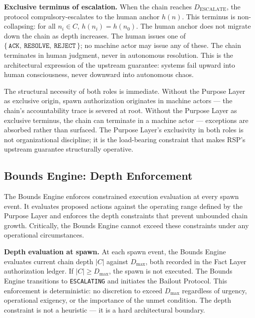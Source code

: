 \medskip
\noindent\textbf{Exclusive terminus of escalation.} When the chain reaches $D_{\mathrm{ESCALATE}}$, the protocol compulsory-escalates to the human anchor $h(n)$. This terminus is non-collapsing: for all $n_i \in C$, $h(n_i) = h(n_0)$. The human anchor does not migrate down the chain as depth increases. The human issues one of $\{\,\texttt{ACK},\ \texttt{RESOLVE},\ \texttt{REJECT}\,\}$; no machine actor may issue any of these. The chain terminates in human judgment, never in autonomous resolution. This is the architectural expression of the upstream \bxthree{} guarantee: \bxthree{} systems fail upward into human consciousness, never downward into autonomous chaos.

The structural necessity of both roles is immediate. Without the Purpose Layer as exclusive origin, spawn authorization originates in machine actors — the chain's accountability trace is severed at root. Without the Purpose Layer as exclusive terminus, the chain can terminate in a machine actor — exceptions are absorbed rather than surfaced. The Purpose Layer's exclusivity in both roles is not organizational discipline; it is the load-bearing constraint that makes RSP's upstream guarantee structurally operative.

\subsection{Bounds Engine: Depth Enforcement}
\label{sec:rs-bounds}

The Bounds Engine enforces constrained execution evaluation at every spawn event. It evaluates proposed actions against the operating range defined by the Purpose Layer and enforces the depth constraints that prevent unbounded chain growth. Critically, the Bounds Engine cannot exceed these constraints under any operational circumstances.

\medskip
\noindent\textbf{Depth evaluation at spawn.} At each spawn event, the Bounds Engine evaluates current chain depth $|C|$ against $D_{\mathrm{max}}$, both recorded in the Fact Layer authorization ledger. If $|C| \geq D_{\mathrm{max}}$, the spawn is not executed. The Bounds Engine transitions to \texttt{ESCALATING} and initiates the Bailout Protocol. This enforcement is deterministic: no discretion to exceed $D_{\mathrm{max}}$ regardless of urgency, operational exigency, or the importance of the unmet condition. The depth constraint is not a heuristic — it is a hard architectural boundary.

